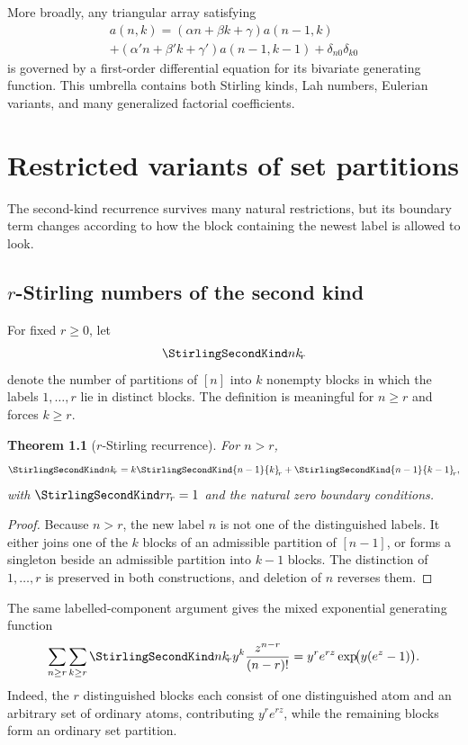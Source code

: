 \documentclass[11pt,a4paper,oneside,openany]{book}
\newtheorem{theorem}{Theorem}[chapter]
\theoremstyle{definition}
\theoremstyle{remark}
\begin{document}
More broadly, any triangular array satisfying
\begin{multline}\label{eq:triangular-general-recurrence}
 a(n,k)=(\alpha n+\beta k+\gamma)a(n-1,k)\\
 +(\alpha'n+\beta'k+\gamma')a(n-1,k-1)+\delta_{n0}\delta_{k0}
\end{multline}
is governed by a first-order differential equation for its bivariate generating
function.  This umbrella contains both Stirling kinds, Lah numbers, Eulerian
variants, and many generalized factorial coefficients.



\chapter{Restricted variants of set partitions}
\label{ch:stirling-variants}
The second-kind recurrence survives many natural restrictions, but its boundary
term changes according to how the block containing the newest label is allowed to
look.

\section{\texorpdfstring{$r$}{r}-Stirling numbers of the second kind}
For fixed $r\ge0$, let
\[
 \StirlingSecondKind nk_{\!r}
\]
denote the number of partitions of $[n]$ into $k$ nonempty blocks in which the
labels $1,\ldots,r$ lie in distinct blocks.  The definition is meaningful for
$n\ge r$ and forces $k\ge r$.

\begin{theorem}[$r$-Stirling recurrence]
\label{thm:r-stirling-recurrence}
For $n>r$,
\begin{equation}
\label{eq:r-stirling-recurrence}
 \StirlingSecondKind nk_{\!r}
 =k\StirlingSecondKind{n-1}{k}_{\!r}+\StirlingSecondKind{n-1}{k-1}_{\!r},
\end{equation}
with $\StirlingSecondKind rr_{\!r}=1$ and the natural zero boundary conditions.
\end{theorem}
\begin{proof}
Because $n>r$, the new label $n$ is not one of the distinguished labels.  It either
joins one of the $k$ blocks of an admissible partition of $[n-1]$, or forms a
singleton beside an admissible partition into $k-1$ blocks.  The distinction of
$1,\ldots,r$ is preserved in both constructions, and deletion of $n$ reverses
them.
\end{proof}

The same labelled-component argument gives the mixed exponential generating
function
\begin{equation}
\label{eq:r-stirling-egf}
 \sum_{n\ge r}\sum_{k\ge r}\StirlingSecondKind nk_{\!r}
 y^k\frac{z^{n-r}}{(n-r)!}
 =y^re^{rz}\exp\!\bigl(y(e^z-1)\bigr).
\end{equation}
Indeed, the $r$ distinguished blocks each consist of one distinguished atom and an
arbitrary set of ordinary atoms, contributing $y^re^{rz}$, while the remaining
blocks form an ordinary set partition.
\end{document}
